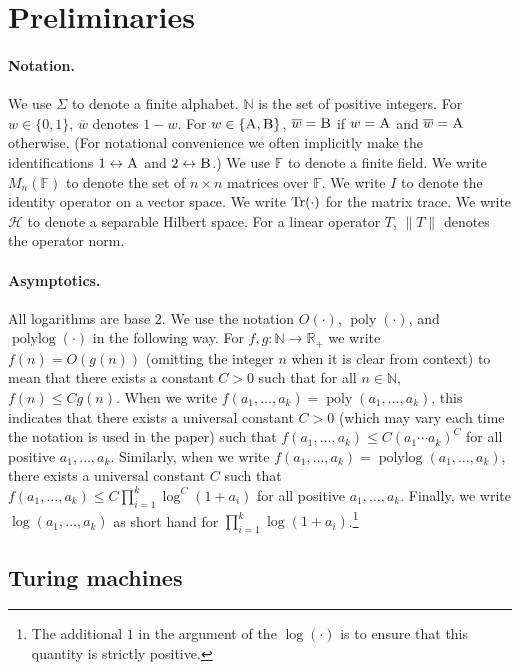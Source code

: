 \documentclass[11pt]{article}
\theoremstyle{definition}
\newcommand{\Tr}{\mbox{\rm Tr}}
\newcommand{\N}{\ensuremath{\mathbb{N}}}
\newcommand{\F}{\ensuremath{\mathbb{F}}}
\newcommand{\R}{\ensuremath{\mathbb{R}}}
\newcommand{\mH}{\ensuremath{\mathcal{H}}}
\DeclareMathOperator{\poly}{poly}
\DeclareMathOperator{\polylog}{polylog}
\newcommand{\labelstyle}[1]{\ensuremath{\textsc{#1}}\xspace}
\newcommand{\alice}{\labelstyle{A}}
\newcommand{\bob}{\labelstyle{B}}
\begin{document}
\section{Preliminaries}
\label{sec:prelim}

\paragraph{Notation.}
We use $\Sigma$ to denote a finite alphabet.
$\N$ is the set of positive integers.
For $w\in\{0,1\}$, $\overline{w}$ denotes $1-w$.
For $w\in\{\alice,\bob\}$, $\overline{w}=\bob$ if $w=\alice$ and
$\overline{w}=\alice$ otherwise.
(For notational convenience we often implicitly make the identifications
$1\leftrightarrow \alice$ and $2\leftrightarrow \bob$.)
We use $\F$ to denote a finite field.
We write $M_n(\F)$ to denote the set of $n\times n$ matrices over $\F$.
We write $I$ to denote the identity operator on a vector space.
We write $\Tr(\cdot)$ for the matrix trace.
We write $\mH$ to denote a separable Hilbert space.
For a linear operator $T$, $\|T\|$ denotes the operator norm.

\paragraph{Asymptotics.}
All logarithms are base $2$.
We use the notation $O(\cdot)$, $\poly(\cdot)$, and $\polylog(\cdot)$ in the
following way.
For $f,g:\N\to\R_+$ we write $f(n)=O(g(n))$ (omitting the integer $n$ when it is
clear from context) to mean that there exists a constant $C>0$ such that for all
$n\in\N$, $f(n)\leq C g(n)$.
When we write $f(a_1,\ldots,a_k) = \poly(a_1,\ldots,a_k)$, this indicates that
there exists a universal constant $C > 0$ (which may vary each time the notation
is used in the paper) such that $f(a_1,\ldots,a_k) \leq C( a_1 \cdots a_k)^C$
for all positive $a_1,\ldots,a_k$.
Similarly, when we write $f(a_1,\ldots,a_k) = \polylog(a_1,\ldots,a_k)$, there
exists a universal constant $C$ such that $f(a_1,\ldots,a_k) \leq C\prod_{i =
  1}^k \log^C (1+ a_i)$ for all positive $a_1,\ldots,a_k$.
Finally, we write $\log(a_1,\ldots,a_k)$ as short hand for $\prod_{i = 1}^k \log
(1 + a_i)$.\footnote{The additional $1$ in the argument of the $\log(\cdot)$ is
  to ensure that this quantity is strictly positive.}

\subsection{Turing machines}
\label{sec:tms}
\end{document}
